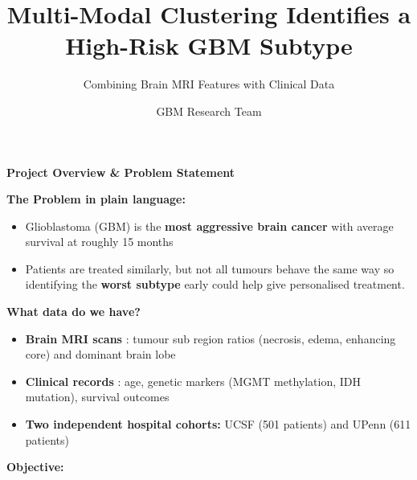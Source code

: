 \documentclass[aspectratio=169, 10pt]{beamer}
\title[GBM Clustering]{\large Multi-Modal Clustering Identifies a High-Risk GBM Subtype}
\subtitle{Combining Brain MRI Features with Clinical Data}
\author{GBM Research Team}
\date{}
\begin{document}
\begin{frame}{\textbf{Project Overview \& Problem Statement}}
\small

\textbf{The Problem in plain language:}
\begin{itemize}
    \item Glioblastoma (GBM) is the \textbf{most aggressive brain cancer} with average survival at roughly 15 months
    \item Patients are treated similarly, but not all tumours behave the same way so identifying the \textbf{worst subtype} early could help give personalised treatment.
\end{itemize}

\vspace{0.15cm}
\textbf{What data do we have?}
\begin{itemize}
    \item \textbf{Brain MRI scans} : tumour sub region ratios (necrosis, edema, enhancing core) and dominant brain lobe
    \item \textbf{Clinical records} : age, genetic markers (MGMT methylation, IDH mutation), survival outcomes
    \item \textbf{Two independent hospital cohorts:} UCSF (501 patients) and UPenn (611 patients)
\end{itemize}

\vspace{0.15cm}
\textbf{Objective:}
\begin{center}
\end{center}

\end{frame}
\end{document}
